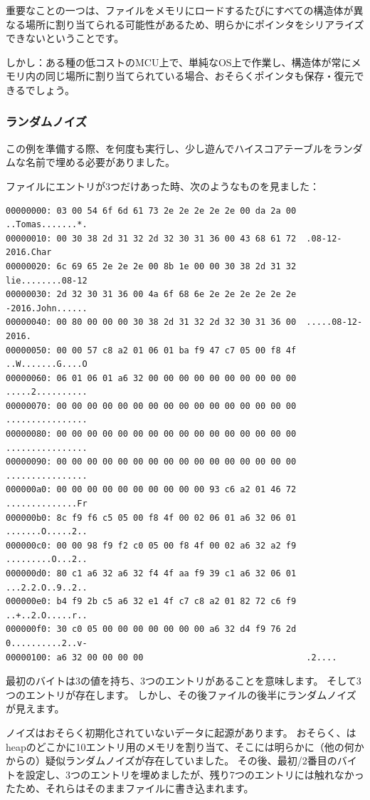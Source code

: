 重要なことの一つは、ファイルをメモリにロードするたびにすべての構造体が異なる場所に割り当てられる可能性があるため、明らかにポインタをシリアライズできないということです。

しかし：ある種の低コストの\ac{MCU}上で、単純な\ac{OS}上で作業し、構造体が常にメモリ内の同じ場所に割り当てられている場合、おそらくポインタも保存・復元できるでしょう。

\subsubsection{ランダムノイズ}

この例を準備する際、を何度も実行し、少し遊んでハイスコアテーブルをランダムな名前で埋める必要がありました。

ファイルにエントリが3つだけあった時、次のようなものを見ました：

\begin{lstlisting}
00000000: 03 00 54 6f 6d 61 73 2e 2e 2e 2e 2e 00 da 2a 00  ..Tomas.......*.
00000010: 00 30 38 2d 31 32 2d 32 30 31 36 00 43 68 61 72  .08-12-2016.Char
00000020: 6c 69 65 2e 2e 2e 00 8b 1e 00 00 30 38 2d 31 32  lie........08-12
00000030: 2d 32 30 31 36 00 4a 6f 68 6e 2e 2e 2e 2e 2e 2e  -2016.John......
00000040: 00 80 00 00 00 30 38 2d 31 32 2d 32 30 31 36 00  .....08-12-2016.
00000050: 00 00 57 c8 a2 01 06 01 ba f9 47 c7 05 00 f8 4f  ..W.......G....O
00000060: 06 01 06 01 a6 32 00 00 00 00 00 00 00 00 00 00  .....2..........
00000070: 00 00 00 00 00 00 00 00 00 00 00 00 00 00 00 00  ................
00000080: 00 00 00 00 00 00 00 00 00 00 00 00 00 00 00 00  ................
00000090: 00 00 00 00 00 00 00 00 00 00 00 00 00 00 00 00  ................
000000a0: 00 00 00 00 00 00 00 00 00 00 93 c6 a2 01 46 72  ..............Fr
000000b0: 8c f9 f6 c5 05 00 f8 4f 00 02 06 01 a6 32 06 01  .......O.....2..
000000c0: 00 00 98 f9 f2 c0 05 00 f8 4f 00 02 a6 32 a2 f9  .........O...2..
000000d0: 80 c1 a6 32 a6 32 f4 4f aa f9 39 c1 a6 32 06 01  ...2.2.O..9..2..
000000e0: b4 f9 2b c5 a6 32 e1 4f c7 c8 a2 01 82 72 c6 f9  ..+..2.O.....r..
000000f0: 30 c0 05 00 00 00 00 00 00 00 a6 32 d4 f9 76 2d  0..........2..v-
00000100: a6 32 00 00 00 00                                .2....
\end{lstlisting}

最初のバイトは3の値を持ち、3つのエントリがあることを意味します。
そして3つのエントリが存在します。
しかし、その後ファイルの後半にランダムノイズが見えます。

ノイズはおそらく初期化されていないデータに起源があります。
おそらく、は\gls{heap}のどこかに10エントリ用のメモリを割り当て、そこには明らかに（他の何かからの）疑似ランダムノイズが存在していました。
その後、最初/2番目のバイトを設定し、3つのエントリを埋めましたが、残り7つのエントリには触れなかったため、それらはそのままファイルに書き込まれます。

